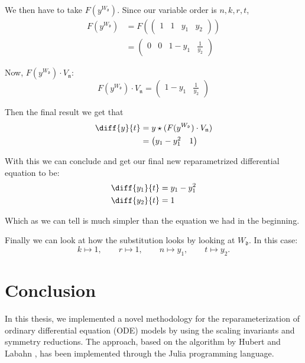 \documentclass[oneside, a4paper, onecolumn, 11pt]{article}
\begin{document}
We then have to take \(F(y^{W_{\mathfrak{d}}})\). Since our variable order is \(n, k, r, t\),
\begin{align*}
    F(y^{W_{\mathfrak{d}}})
     & = F(\begin{pmatrix}
               1 & 1 & y_1 & y_2
           \end{pmatrix})             \\
     & = \begin{pmatrix}
             0 & 0 & 1 - y_1 & \frac{1}{y_2}
         \end{pmatrix}
\end{align*}

Now, \(F(y^{W_{\mathfrak{d}}}) \cdot V_{\mathfrak{n}}\):
\[
    F(y^{W_{\mathfrak{d}}}) \cdot V_{\mathfrak{n}} =
    \begin{pmatrix}
        1 - y_1 & \frac{1}{y_2}
    \end{pmatrix}
\]

Then the final result we get that
\begin{align*}
    \diff{y}{t}
     & = y \star (F(y^{W_{\mathfrak{d}}}) \cdot V_{\mathfrak{n}}) \\
     & = \begin{pmatrix} y_1 - y_1^2 & 1 \end{pmatrix}
\end{align*}

With this we can conclude and get our final new reparametrized differential equation to be:
\begin{align*}
    \diff{y_1}{t} & = y_1 - y_1^2 \\
    \diff{y_2}{t} & = 1
\end{align*}

Which as we can tell is much simpler than the equation we had in the beginning.

Finally we can look at how the substitution looks by looking at \(W_{\mathfrak{d}}\). In this case:
\[
    k \mapsto 1, \qquad r \mapsto 1, \qquad n \mapsto y_1, \qquad t \mapsto y_2.
\]

\section{Conclusion}

In this thesis, we implemented a novel methodology for the reparameterization of ordinary differential equation (ODE) models by using the scaling invariants and symmetry reductions. The approach, based on the algorithm by Hubert and Labahn \cite{Hubert2013}, has been implemented through the Julia programming language.
\end{document}
